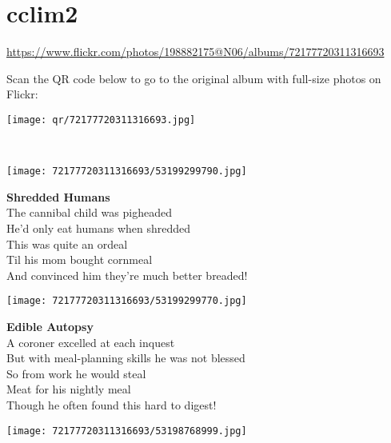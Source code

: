 \documentclass[10pt,letterpaper]{article}
\title{}
\author{}
\date{}
\begin{document}
\section*{cclim2}

\url{https://www.flickr.com/photos/198882175@N06/albums/72177720311316693}

Scan the QR code below to go to the original album with full-size photos on Flickr:

\begin{center}
\texttt{[image: qr/72177720311316693.jpg]}
\end{center}
\pagebreak
\newpage

\ %

\newpage

\begin{center}\texttt{[image: 72177720311316693/53199299790.jpg]}
\end{center}
\begin{center}
\textbf{Shredded Humans}\\
\vskip 0.2in
The cannibal child was pigheaded\\
He'd only eat humans when shredded\\
This was quite an ordeal\\
Til his mom bought cornmeal\\
And convinced him they're much better breaded!\\
\end{center}
\pagebreak

\begin{center}
\texttt{[image: 72177720311316693/53199299770.jpg]}
\end{center}

\begin{center}
\textbf{Edible Autopsy}\\
\vskip 0.2in
A coroner excelled at each inquest\\
But with meal-planning skills he was not blessed\\
So from work he would steal\\
Meat for his nightly meal\\
Though he often found this hard to digest!\\
\end{center}
\pagebreak

\begin{center}
\texttt{[image: 72177720311316693/53198768999.jpg]}
\end{center}
\end{document}
